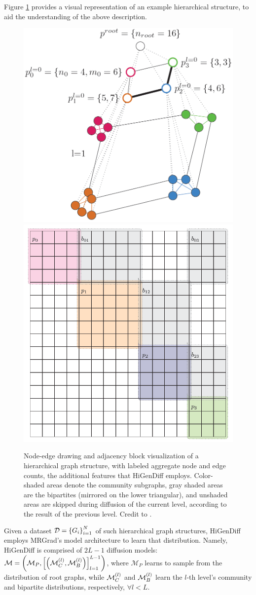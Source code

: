 Figure \ref{fig:higendiff} provides a visual representation of an example hierarchical structure, to aid the understanding of the above description.
\begin{figure}[H]
    \centering
    \includegraphics[width=0.45\linewidth]{figures/higendiff/hierarchical_graph.png}
    \hfill
    \includegraphics[width=0.45\linewidth]{figures/higendiff/hierarchical_adj.png}
    \caption[Node-edge drawing and adjacency block visualization of a hierarchical graph structure.]{Node-edge drawing and adjacency block visualization of a hierarchical graph structure, with labeled aggregate node and edge counts, the additional features that HiGenDiff employs. Color-shaded areas denote the community subgraphs, gray shaded areas are the bipartites (mirrored on the lower triangular), and unshaded areas are skipped during diffusion of the current level, according to the result of the previous level. Credit to \cite{karami_multi-resolution_2024}.}
    \label{fig:higendiff}
\end{figure}
Given a dataset $\mathcal{D}=\mathopen{}\left\{G_i\right\}_{i=1}^{N}$ of such hierarchical graph structures, HiGenDiff employs MRGrad's model architecture \cite{karami_multi-resolution_2024} to learn that distribution. Namely, HiGenDiff is comprised of $2L-1$ diffusion models: $\mathcal{M}=\mathopen{}\left(\mathcal{M}_P,\mathopen{}\left[\mathopen{}\left(\mathcal{M}^{\mathopen{}\left(l\right)}_C,\mathcal{M}^{\mathopen{}\left(l\right)}_B\right)\right]_{l=1}^{L-1}\right)$, where $\mathcal{M}_P$ learns to sample from the distribution of root graphs, while $\mathcal{M}^{\mathopen{}\left(l\right)}_C$ and $\mathcal{M}^{\mathopen{}\left(l\right)}_B$ learn the $l$-th level's community and bipartite distributions, respectively, $\forall l<L$. 

